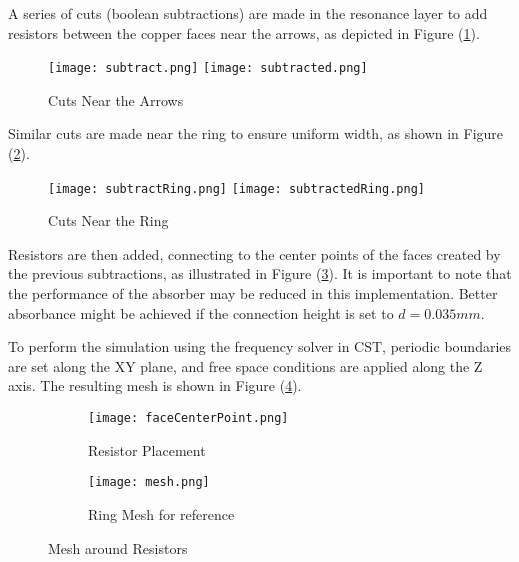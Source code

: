         A series of cuts (boolean subtractions) are made in the resonance layer
        to add resistors between the copper faces near the arrows, as depicted 
        in Figure (\ref{img:arrowCuts}).
        \begin{figure}[h]
            \centering
            \texttt{[image: subtract.png]}\hfil
            \texttt{[image: subtracted.png]}
            \caption{Cuts Near the Arrows}
            \label{img:arrowCuts}
        \end{figure}

        Similar cuts are made near the ring to ensure uniform width, as shown 
        in Figure (\ref{img:ringCuts}).
        \begin{figure}[h]
            \centering
            \texttt{[image: subtractRing.png]}\hfil
            \texttt{[image: subtractedRing.png]}
            \caption{Cuts Near the Ring}
            \label{img:ringCuts}
        \end{figure}

        Resistors are then added, connecting to the center points of the faces
        created by the previous subtractions, as illustrated in Figure 
        (\ref{img:resistors}). It is important to note that the performance of 
        the absorber may be reduced in this implementation. Better absorbance 
        might be achieved if the connection height is set to $d=0.035mm$.

        To perform the simulation using the frequency solver in CST, periodic 
        boundaries are set along the XY plane, and free space conditions are 
        applied along the Z axis. The resulting mesh is shown in Figure 
        (\ref{img:RingAndArrowMesh}).
        
        \begin{figure}[h]
            \centering
            \begin{subfigure}{0.39\textwidth}
                \centering
                \texttt{[image: faceCenterPoint.png]}
                \caption{Resistor Placement}
                \label{img:resistors}
            \end{subfigure}
            \hfill
            \begin{subfigure}{0.39\textwidth}
                \centering
                \texttt{[image: mesh.png]}
                \caption{Ring Mesh for reference}
                \label{img:RingAndArrowMesh}
            \end{subfigure}
            \caption{Mesh around Resistors}
            \label{fig:combined}
        \end{figure}

